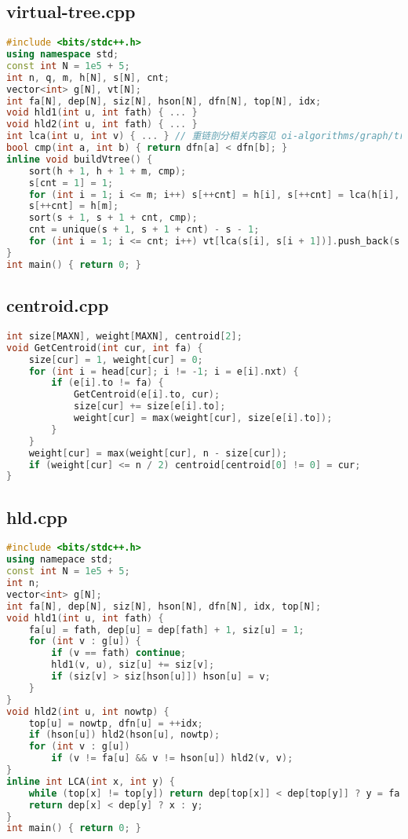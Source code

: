 \documentclass[9pt, a4paper, oneside]{book}
\begin{document}
\subsection{virtual-tree.cpp}
\begin{lstlisting}[language={C++}]
#include <bits/stdc++.h>
using namespace std;
const int N = 1e5 + 5;
int n, q, m, h[N], s[N], cnt;
vector<int> g[N], vt[N];
int fa[N], dep[N], siz[N], hson[N], dfn[N], top[N], idx;
void hld1(int u, int fath) { ... }
void hld2(int u, int fath) { ... }
int lca(int u, int v) { ... } // 重链剖分相关内容见 oi-algorithms/graph/tree/hld.cpp
bool cmp(int a, int b) { return dfn[a] < dfn[b]; }
inline void buildVtree() {
    sort(h + 1, h + 1 + m, cmp);
    s[cnt = 1] = 1;
    for (int i = 1; i <= m; i++) s[++cnt] = h[i], s[++cnt] = lca(h[i], h[i + 1]);
    s[++cnt] = h[m];
    sort(s + 1, s + 1 + cnt, cmp);
    cnt = unique(s + 1, s + 1 + cnt) - s - 1;
    for (int i = 1; i <= cnt; i++) vt[lca(s[i], s[i + 1])].push_back(s[i + 1]);
}
int main() { return 0; }\end{lstlisting}
\subsection{centroid.cpp}
\begin{lstlisting}[language={C++}]
int size[MAXN], weight[MAXN], centroid[2];
void GetCentroid(int cur, int fa) {
    size[cur] = 1, weight[cur] = 0;
    for (int i = head[cur]; i != -1; i = e[i].nxt) {
        if (e[i].to != fa) {
            GetCentroid(e[i].to, cur);
            size[cur] += size[e[i].to];
            weight[cur] = max(weight[cur], size[e[i].to]);
        }
    }
    weight[cur] = max(weight[cur], n - size[cur]);
    if (weight[cur] <= n / 2) centroid[centroid[0] != 0] = cur;
}\end{lstlisting}
\subsection{hld.cpp}
\begin{lstlisting}[language={C++}]
#include <bits/stdc++.h>
using namepace std;
const int N = 1e5 + 5;
int n;
vector<int> g[N];
int fa[N], dep[N], siz[N], hson[N], dfn[N], idx, top[N];
void hld1(int u, int fath) {
    fa[u] = fath, dep[u] = dep[fath] + 1, siz[u] = 1;
    for (int v : g[u]) {
        if (v == fath) continue;
        hld1(v, u), siz[u] += siz[v];
        if (siz[v] > siz[hson[u]]) hson[u] = v;
    }
}
void hld2(int u, int nowtp) {
    top[u] = nowtp, dfn[u] = ++idx;
    if (hson[u]) hld2(hson[u], nowtp);
    for (int v : g[u])
        if (v != fa[u] && v != hson[u]) hld2(v, v);
}
inline int LCA(int x, int y) {
    while (top[x] != top[y]) return dep[top[x]] < dep[top[y]] ? y = fa[top[y]] : x = fa[top[x]];
    return dep[x] < dep[y] ? x : y;
}
int main() { return 0; }\end{lstlisting}
\end{document}
